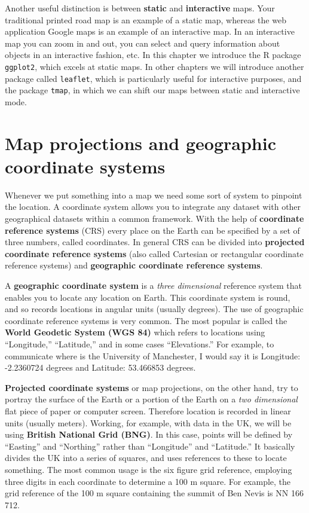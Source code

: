 \documentclass[
]{book}
\begin{document}
Another useful distinction is between \textbf{static} and \textbf{interactive} maps. Your traditional printed road map is an example of a static map, whereas the web application Google maps is an example of an interactive map. In an interactive map you can zoom in and out, you can select and query information about objects in an interactive fashion, etc. In this chapter we introduce the R package \texttt{ggplot2}, which excels at static maps. In other chapters we will introduce another package called \texttt{leaflet}, which is particularly useful for interactive purposes, and the package \texttt{tmap}, in which we can shift our maps between static and interactive mode.

\hypertarget{map-projections-and-geographic-coordinate-systems}{%
\section{Map projections and geographic coordinate systems}\label{map-projections-and-geographic-coordinate-systems}}

Whenever we put something into a map we need some sort of system to pinpoint the location. A coordinate system allows you to integrate any dataset with other geographical datasets within a common framework. With the help of \textbf{coordinate reference systems} (CRS) every place on the Earth can be specified by a set of three numbers, called coordinates. In general CRS can be divided into \textbf{projected coordinate reference systems} (also called Cartesian or rectangular coordinate reference systems) and \textbf{geographic coordinate reference systems}.

A \textbf{geographic coordinate system} is a \emph{three dimensional} reference system that enables you to locate any location on Earth. This coordinate system is round, and so records locations in angular units (usually degrees). The use of geographic coordinate reference systems is very common. The most popular is called the \textbf{World Geodetic System (WGS 84)} which refers to locations using ``Longitude,'' ``Latitude,'' and in some cases ``Elevations.'' For example, to communicate where is the University of Manchester, I would say it is Longitude: -2.2360724 degrees and Latitude: 53.466853 degrees.

\textbf{Projected coordinate systems} or map projections, on the other hand, try to portray the surface of the Earth or a portion of the Earth on a \emph{two dimensional} flat piece of paper or computer screen. Therefore location is recorded in linear units (usually meters). Working, for example, with data in the UK, we will be using \textbf{British National Grid (BNG)}. In this case, points will be defined by ``Easting'' and ``Northing'' rather than ``Longitude'' and ``Latitude.'' It basically divides the UK into a series of squares, and uses references to these to locate something. The most common usage is the six figure grid reference, employing three digits in each coordinate to determine a 100 m square. For example, the grid reference of the 100 m square containing the summit of Ben Nevis is NN 166 712.
\end{document}
